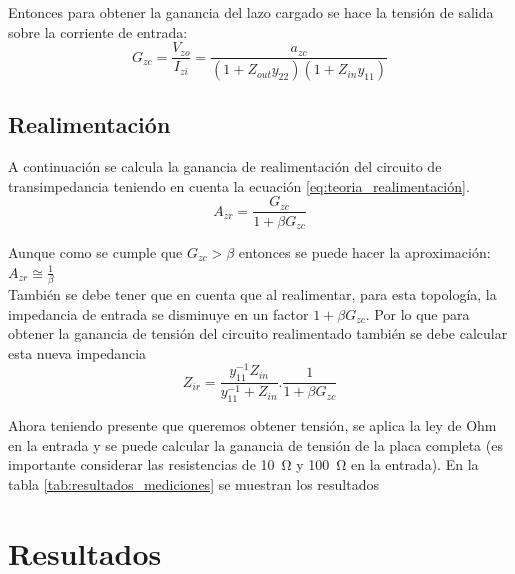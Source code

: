 \documentclass[letterpaper, 10 pt, conference]{ieeeconf}  %
\begin{document}
Entonces para obtener la ganancia del lazo cargado se hace la tensión de salida sobre la corriente de entrada:
\[ G_{zc} = \frac{V_{zo}}{I_{zi}} = \frac{a_{zc}}{(1+Z_{out}y_{22})(1+Z_{in}y_{11})} \]

\subsection{Realimentación}
A continuación se calcula la ganancia de realimentación del circuito de transimpedancia teniendo en cuenta la ecuación \ref{eq:teoria_realimentación}.
\begin{equation}
  A_{zr} = \frac{G_{zc}}{1 + \beta G_{zc}}
  \label{eq:teoria_realimentación}
\end{equation}

Aunque como se cumple que $G_{zc} > \beta$ entonces se puede hacer la aproximación: $A_{zr} \cong \frac{1}{\beta}$
\\
También se debe tener que en cuenta que al realimentar, para esta topología, la impedancia de entrada se disminuye en un factor $1+\beta G_{zc}$. Por lo que para obtener la ganancia de tensión del circuito realimentado también se debe calcular esta nueva impedancia
\[ Z_{ir} = \frac{y_{11}^{-1} Z_{in}}{y_{11}^{-1} + Z_{in}} . \frac{1}{1 + \beta G_{zc}} \]

Ahora teniendo presente que queremos obtener tensión, se aplica la ley de Ohm en la entrada y se puede calcular la ganancia de tensión de la placa completa (es importante considerar las resistencias de \qty{10}{\ohm} y \qty{100}{\ohm} en la entrada). En la tabla \ref{tab:resultados_mediciones} se muestran los resultados

\section{Resultados}

\begin{table}[H]
  \centering
  \caption{Resultados analíticos y empíricos}
  \label{tab:resultados_mediciones}
\end{table}
\end{document}
